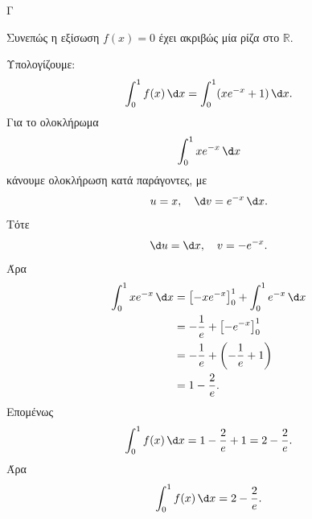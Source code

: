 \begin{thema}{Γ}
\begin{erwthma}
Συνεπώς η εξίσωση $f(x)=0$ έχει ακριβώς μία ρίζα στο $\mathbb{R}$.

\item Υπολογίζουμε:
\[
\dint_0^1 f(x)\,\d x
=\dint_0^1(xe^{-x}+1)\,\d x.
\]
Για το ολοκλήρωμα
\[
\dint_0^1 xe^{-x}\,\d x
\]
κάνουμε ολοκλήρωση κατά παράγοντες, με
\[
u=x,\quad \d v=e^{-x}\,\d x.
\]
Τότε
\[
\d u=\d x,\quad v=-e^{-x}.
\]
Άρα
\begin{align*}
\dint_0^1 xe^{-x}\,\d x
&=\left[-xe^{-x}\right]_0^1+\dint_0^1 e^{-x}\,\d x\\
&=-\frac1e+\left[-e^{-x}\right]_0^1\\
&=-\frac1e+\left(-\frac1e+1\right)\\
&=1-\frac{2}{e}.
\end{align*}
Επομένως
\[
\dint_0^1 f(x)\,\d x
=1-\frac{2}{e}+1
=2-\frac{2}{e}.
\]
Άρα
\[
{\dint_0^1 f(x)\,\d x=2-\frac{2}{e}}.
\]
\end{erwthma}
\end{thema}

